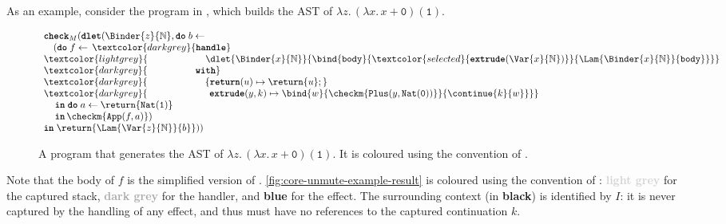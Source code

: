 As an example, consider the program in , which builds the AST of $\lambda z. \, (\lambda x. \, x + \texttt{0}) (\texttt{1})$.
\begin{figure}
\[\begin{array}{l}
  \textbf{\texttt{check}}_M(\textbf{\texttt{dlet}}(\Binder{z}{\mathbb{N}}, \textbf{\texttt{do}} \; b \leftarrow \, \\ 
  \quad (\textbf{\texttt{do}} \; f \leftarrow \, \textcolor{darkgrey}{\textbf{\texttt{handle}}} \\
  \textcolor{lightgrey}{\;\;\;\,\quad \quad \quad\quad\quad {\dlet{\Binder{x}{\mathbb{N}}}{
  \bind{\texttt{body}}{\textcolor{selected}{\textbf{\texttt{extrude}}(\Var{x}{\mathbb{N}})}}{\Lam{\Binder{x}{\mathbb{N}}}{\texttt{body}}}}}} \\ 
  \textcolor{darkgrey}{\;\;\;\,\quad \quad\quad\quad \textbf{\texttt{with}}} \\ 
  \textcolor{darkgrey}{\;\;\;\,\quad \quad\quad\quad \quad \{ \textbf{\texttt{return}}(u) \mapsto {\return{u}};} \\ 
  \textcolor{darkgrey}{\;\;\;\, \quad \quad\quad\quad \quad \;\, \textbf{\texttt{extrude}}(y, k) \mapsto {\bind{w}{\checkm{\texttt{Plus}(y, \texttt{Nat}(\texttt{0}))}}{\continue{k}{w}}}\}} \\ 
  \, \quad \textbf{\texttt{in}} \; \textbf{\texttt{do}} \; {a}\leftarrow {\return{\texttt{Nat}(\texttt{1})}}\\
  \, \quad \textbf{\texttt{in}} \, {\checkm{\texttt{App}(f, a)}})\; \\
  \textbf{\texttt{in}} \; \return{\Lam{\Var{z}{\mathbb{N}}}{b}})) 
\end{array}\]
\caption{A \coreLang{} program that generates the AST of $\lambda z. \, (\lambda x. \, x + \texttt{0}) (\texttt{1})$. It is coloured using the convention of .}
\label{fig:core-unmute-example}
\end{figure}
Note that the body of $f$ is the simplified version of . \cref{fig:core-unmute-example-result} is coloured using the convention of : \textbf{\textcolor{lightgrey}{light grey}} for the captured stack, \textbf{\textcolor{darkgrey}{dark grey}} for the handler, and \textbf{\textcolor{selected}{blue}} for the effect. The surrounding context (in \textbf{black}) is identified by $I$: it is never captured by the handling of any effect, and thus must have no references to the captured continuation $k$.


